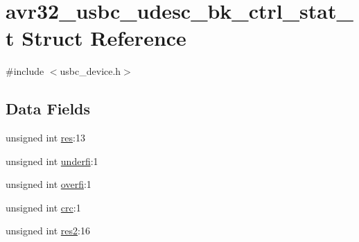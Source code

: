 \hypertarget{structavr32__usbc__udesc__bk__ctrl__stat__t}{
\section{avr32\-\_\-usbc\-\_\-udesc\-\_\-bk\-\_\-ctrl\-\_\-stat\-\_\-t \-Struct \-Reference}
\label{structavr32__usbc__udesc__bk__ctrl__stat__t}
}


{\ttfamily \#include $<$usbc\-\_\-device.\-h$>$}

\subsection*{\-Data \-Fields}
\begin{DoxyCompactItemize}
\item 
unsigned int \hyperlink{structavr32__usbc__udesc__bk__ctrl__stat__t_a3d09be99f8d069542586bf81ea98a45b}{res}\-:13
\item 
unsigned int \hyperlink{structavr32__usbc__udesc__bk__ctrl__stat__t_a5a09d844a7cced23f3bc9607f414d267}{underfi}\-:1
\item 
unsigned int \hyperlink{structavr32__usbc__udesc__bk__ctrl__stat__t_a4d24b3e71d0b40287ca916bca77cb1f7}{overfi}\-:1
\item 
unsigned int \hyperlink{structavr32__usbc__udesc__bk__ctrl__stat__t_ae6a25445fe0f4482ec649c9b06750aac}{crc}\-:1
\item 
unsigned int \hyperlink{structavr32__usbc__udesc__bk__ctrl__stat__t_ac9ad59edfb63670572be4e0d095f15f7}{res2}\-:16
\end{DoxyCompactItemize}


